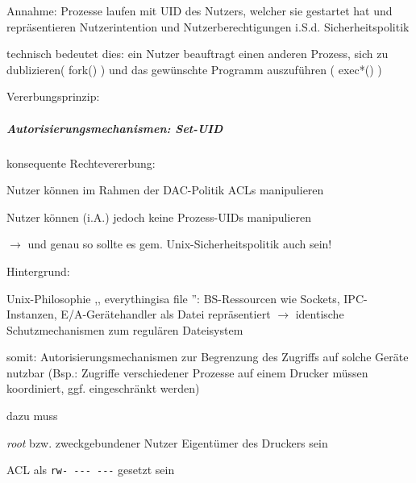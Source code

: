 \documentclass[a4paper]{article}
\begin{document}
\begin{multicols}{3}
    \begin{itemize*}
        \item
        Annahme: Prozesse laufen mit UID des Nutzers, welcher sie gestartet
        hat und repräsentieren Nutzerintention und Nutzerberechtigungen i.S.d.
        Sicherheitspolitik
        \item
        technisch bedeutet dies: ein Nutzer beauftragt einen anderen Prozess,
        sich zu dublizieren( fork() ) und das gewünschte Programm auszuführen
        ( exec*() )
        \item
        Vererbungsprinzip:
    \end{itemize*}


    \subparagraph{Autorisierungsmechanismen:
        Set-UID}

    konsequente Rechtevererbung:

    \begin{itemize*}
        \item
        Nutzer können im Rahmen der DAC-Politik ACLs manipulieren
        \item
        Nutzer können (i.A.) jedoch keine Prozess-UIDs manipulieren
        \item
        $\rightarrow$  und genau so sollte es gem.
        Unix-Sicherheitspolitik auch sein!
    \end{itemize*}

    Hintergrund:

    \begin{itemize*}
        \item
        Unix-Philosophie ,, everythingisa file '': BS-Ressourcen wie Sockets,
        IPC-Instanzen, E/A-Gerätehandler als Datei repräsentiert
        $\rightarrow$  identische Schutzmechanismen zum
        regulären Dateisystem
        \item
        somit: Autorisierungsmechanismen zur Begrenzung des Zugriffs auf
        solche Geräte nutzbar (Bsp.: Zugriffe verschiedener Prozesse auf einem
        Drucker müssen koordiniert, ggf. eingeschränkt werden)
        \item
        dazu muss
        \begin{itemize*}
            \item \emph{root} bzw. zweckgebundener Nutzer Eigentümer des Druckers sein
            \item ACL als \texttt{rw-\ -\/-\/-\ -\/-\/-} gesetzt sein
        \end{itemize*}
    \end{itemize*}


\end{multicols}
\end{document}
